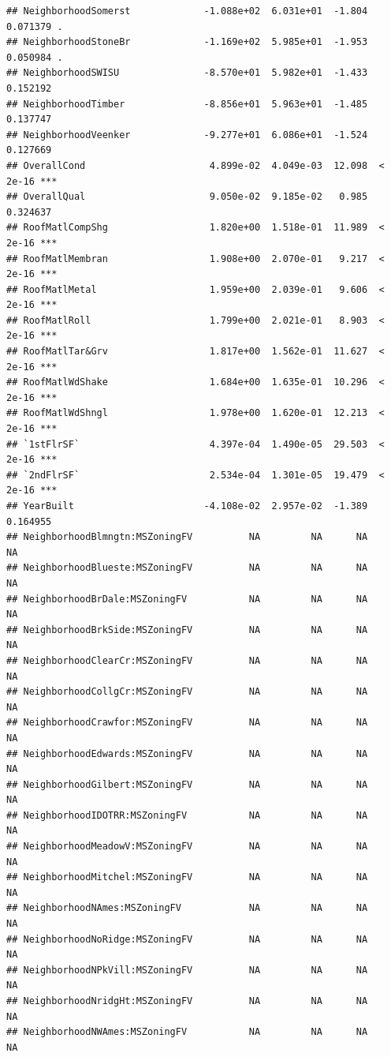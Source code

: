 \documentclass[american,]{article}
\theoremstyle{definition}
\theoremstyle{definition}
\theoremstyle{definition}
\theoremstyle{remark}
\begin{document}
\begin{verbatim}
## NeighborhoodSomerst             -1.088e+02  6.031e+01  -1.804 0.071379 .  
## NeighborhoodStoneBr             -1.169e+02  5.985e+01  -1.953 0.050984 .  
## NeighborhoodSWISU               -8.570e+01  5.982e+01  -1.433 0.152192    
## NeighborhoodTimber              -8.856e+01  5.963e+01  -1.485 0.137747    
## NeighborhoodVeenker             -9.277e+01  6.086e+01  -1.524 0.127669    
## OverallCond                      4.899e-02  4.049e-03  12.098  < 2e-16 ***
## OverallQual                      9.050e-02  9.185e-02   0.985 0.324637    
## RoofMatlCompShg                  1.820e+00  1.518e-01  11.989  < 2e-16 ***
## RoofMatlMembran                  1.908e+00  2.070e-01   9.217  < 2e-16 ***
## RoofMatlMetal                    1.959e+00  2.039e-01   9.606  < 2e-16 ***
## RoofMatlRoll                     1.799e+00  2.021e-01   8.903  < 2e-16 ***
## RoofMatlTar&Grv                  1.817e+00  1.562e-01  11.627  < 2e-16 ***
## RoofMatlWdShake                  1.684e+00  1.635e-01  10.296  < 2e-16 ***
## RoofMatlWdShngl                  1.978e+00  1.620e-01  12.213  < 2e-16 ***
## `1stFlrSF`                       4.397e-04  1.490e-05  29.503  < 2e-16 ***
## `2ndFlrSF`                       2.534e-04  1.301e-05  19.479  < 2e-16 ***
## YearBuilt                       -4.108e-02  2.957e-02  -1.389 0.164955    
## NeighborhoodBlmngtn:MSZoningFV          NA         NA      NA       NA    
## NeighborhoodBlueste:MSZoningFV          NA         NA      NA       NA    
## NeighborhoodBrDale:MSZoningFV           NA         NA      NA       NA    
## NeighborhoodBrkSide:MSZoningFV          NA         NA      NA       NA    
## NeighborhoodClearCr:MSZoningFV          NA         NA      NA       NA    
## NeighborhoodCollgCr:MSZoningFV          NA         NA      NA       NA    
## NeighborhoodCrawfor:MSZoningFV          NA         NA      NA       NA    
## NeighborhoodEdwards:MSZoningFV          NA         NA      NA       NA    
## NeighborhoodGilbert:MSZoningFV          NA         NA      NA       NA    
## NeighborhoodIDOTRR:MSZoningFV           NA         NA      NA       NA    
## NeighborhoodMeadowV:MSZoningFV          NA         NA      NA       NA    
## NeighborhoodMitchel:MSZoningFV          NA         NA      NA       NA    
## NeighborhoodNAmes:MSZoningFV            NA         NA      NA       NA    
## NeighborhoodNoRidge:MSZoningFV          NA         NA      NA       NA    
## NeighborhoodNPkVill:MSZoningFV          NA         NA      NA       NA    
## NeighborhoodNridgHt:MSZoningFV          NA         NA      NA       NA    
## NeighborhoodNWAmes:MSZoningFV           NA         NA      NA       NA    

\end{verbatim}
\end{document}

